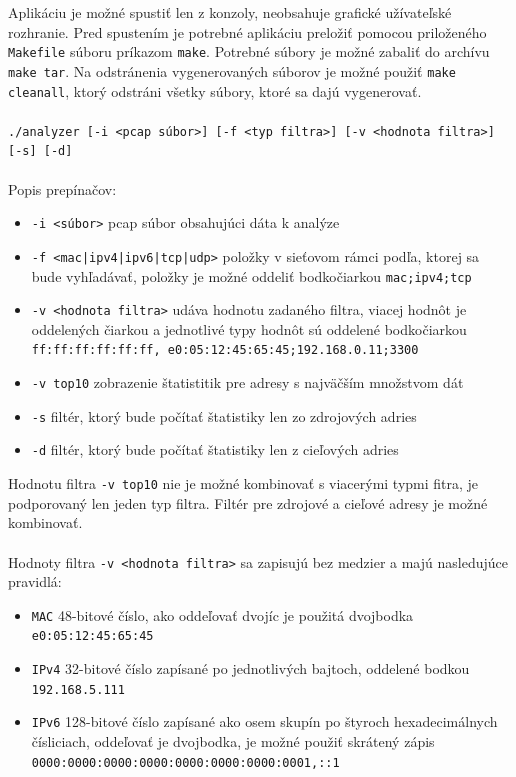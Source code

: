 \documentclass[10pt,a4paper,final]{article}
\begin{document}
\noindent Aplikáciu je možné spustiť len z konzoly, neobsahuje grafické užívateľské rozhranie. Pred spustením je potrebné aplikáciu preložiť pomocou priloženého \texttt{Makefile} súboru príkazom \texttt{make}. Potrebné súbory je možné zabaliť do archívu \texttt{make tar}. Na odstránenia vygenerovaných súborov je možné použiť \texttt{make cleanall}, ktorý odstráni všetky súbory, ktoré sa dajú vygenerovať.
\\\\
\texttt{./analyzer [-i <pcap súbor>] [-f <typ filtra>] [-v <hodnota filtra>] [-s] [-d]}
\\\\
Popis prepínačov:
\begin{itemize}
	\item \texttt{-i <súbor>} pcap súbor obsahujúci dáta k analýze
	\item \texttt{-f <mac|ipv4|ipv6|tcp|udp>} položky v sieťovom rámci podľa, ktorej sa bude vyhľadávať, položky je možné oddeliť bodkočiarkou \texttt{mac;ipv4;tcp}
	\item \texttt{-v <hodnota filtra>} udáva hodnotu zadaného filtra, viacej hodnôt je oddelených čiarkou a jednotlivé typy hodnôt sú oddelené bodkočiarkou \texttt{ff:ff:ff:ff:ff:ff, e0:05:12:45:65:45;192.168.0.11;3300}
	\item \texttt{-v top10}  zobrazenie štatistitik  pre adresy s najväčším množstvom dát
	\item \texttt{-s} filtér, ktorý bude počítať štatistiky len zo zdrojových adries
	\item \texttt{-d} filtér, ktorý bude počítať štatistiky len z cieľových adries
\end{itemize}

Hodnotu filtra \texttt{-v top10} nie je možné kombinovať s viacerými typmi fitra, je podporovaný len jeden typ filtra. Filtér pre zdrojové a cieľové adresy je možné kombinovať.
\\\\
Hodnoty filtra \texttt{-v <hodnota filtra>} sa zapisujú bez medzier a majú nasledujúce pravidlá:
\begin{itemize}
	\item \texttt{MAC} 48-bitové číslo, ako oddeľovať dvojíc je použitá dvojbodka \texttt{e0:05:12:45:65:45}
	\item \texttt{IPv4} 32-bitové číslo zapísané po jednotlivých bajtoch, oddelené bodkou \texttt{192.168.5.111}
	\item \texttt{IPv6} 128-bitové číslo zapísané ako osem skupín po štyroch hexadecimálnych čísliciach, oddeľovať je dvojbodka, je možné použiť skrátený zápis  \texttt{0000:0000:0000:0000:0000:0000:0000:0001,::1}

\end{itemize}
\end{document}
